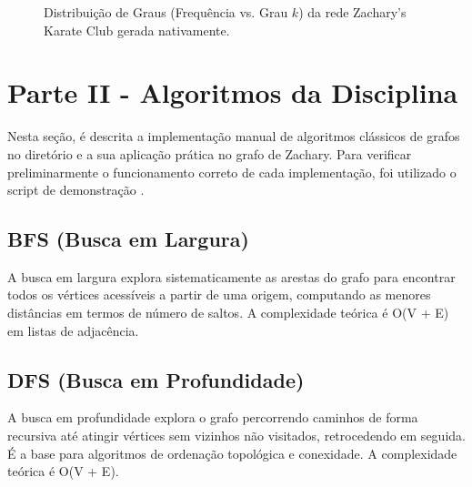 \documentclass[sigconf,nonacm]{webmedia}
\begin{document}
\begin{figure}[h]
  \centering
  \caption{Distribuição de Graus (Frequência vs. Grau $k$) da rede Zachary's Karate Club gerada nativamente.}
  \label{fig:degree_dist}
\end{figure}

\section{Parte II - Algoritmos da Disciplina}
\label{sec:parte_ii}

Nesta seção, é descrita a implementação manual de algoritmos clássicos de grafos no diretório  e a sua aplicação prática no grafo de Zachary. Para verificar preliminarmente o funcionamento correto de cada implementação, foi utilizado o script de demonstração .

\subsection{BFS (Busca em Largura)}
A busca em largura explora sistematicamente as arestas do grafo para encontrar todos os vértices acessíveis a partir de uma origem, computando as menores distâncias em termos de número de saltos. A complexidade teórica é O(V + E) em listas de adjacência.

\subsection{DFS (Busca em Profundidade)}
A busca em profundidade explora o grafo percorrendo caminhos de forma recursiva até atingir vértices sem vizinhos não visitados, retrocedendo em seguida. É a base para algoritmos de ordenação topológica e conexidade. A complexidade teórica é O(V + E).
\end{document}
